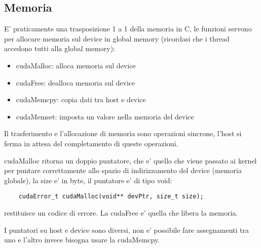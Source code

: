 \subsection{Memoria}
E' praticamente una trasposizione 1 a 1 della memoria in C, le funzioni servono per allocare memoria sul device in global memory (ricordasi che i thread accedono tutti alla global memory):
\begin{itemize}
    \item cudaMalloc: alloca memoria sul device
    \item cudaFree: dealloca memoria sul device
    \item cudaMemcpy: copia dati tra host e device
    \item cudaMemset: imposta un valore nella memoria del device
\end{itemize}
Il trasferimento e l'allocazione di memoria sono operazioni sincrone, l'host si ferma in attesa del completamento di queste operazioni.

cudaMalloc ritorna un doppio puntatore, che e' quello che viene passato ai kernel per puntare correttamente allo spazio di indirizzamento del device (memoria globale), la size e' in byte, il puntatore e' di tipo void\*:
\begin{lstlisting}
    cudaError_t cudaMalloc(void** devPtr, size_t size);
\end{lstlisting}

restituisce un codice di errore. La cudaFree e' quella che libera la memoria.

I puntatori su host e device sono diversi, non e' possibile fare assegnamenti tra uno e l'altro invece bisogna usare la cudaMemcpy.
